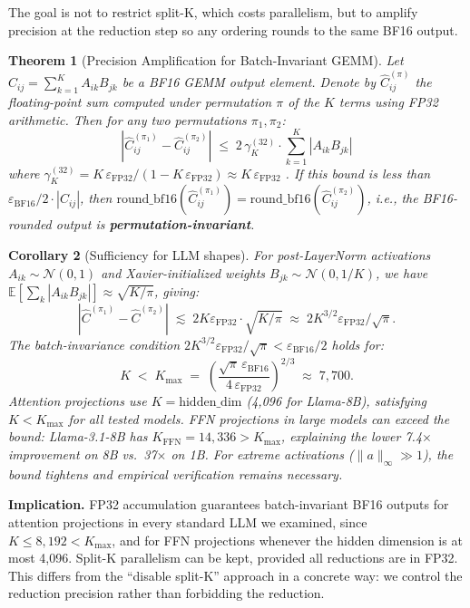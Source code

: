 \documentclass{article}
\newtheorem{theorem}{Theorem}
\newtheorem{corollary}[theorem]{Corollary}
\begin{document}
The goal is not to restrict split-K, which costs parallelism, but to amplify
precision at the reduction step so any ordering rounds to the same BF16 output.

\begin{theorem}[Precision Amplification for Batch-Invariant GEMM]
\label{thm:pa}
Let $C_{ij} = \sum_{k=1}^{K} A_{ik} B_{jk}$ be a BF16 GEMM output element.  Denote by
$\hat{C}_{ij}^{(\pi)}$ the floating-point sum computed under permutation $\pi$ of the
$K$ terms using FP32 arithmetic.  Then for any two permutations $\pi_1, \pi_2$:
\[
  |\hat{C}_{ij}^{(\pi_1)} - \hat{C}_{ij}^{(\pi_2)}|
  \;\le\; 2\,\gamma_K^{(32)} \cdot \sum_{k=1}^{K} |A_{ik} B_{jk}|
\]
where $\gamma_K^{(32)} = K\,\varepsilon_{\mathrm{FP32}}/(1 - K\,\varepsilon_{\mathrm{FP32}})
\approx K\,\varepsilon_{\mathrm{FP32}}$ \citep{higham2002accuracy}.  If this bound is
less than $\varepsilon_{\mathrm{BF16}}/2 \cdot |C_{ij}|$, then
$\mathrm{round\_bf16}(\hat{C}_{ij}^{(\pi_1)}) = \mathrm{round\_bf16}(\hat{C}_{ij}^{(\pi_2)})$,
i.e., the BF16-rounded output is \textbf{permutation-invariant}.
\end{theorem}

\begin{corollary}[Sufficiency for LLM shapes]
\label{cor:llm}
For post-LayerNorm activations $A_{ik} \sim \mathcal{N}(0,1)$ and Xavier-initialized
weights $B_{jk} \sim \mathcal{N}(0, 1/K)$, we have
$\mathbb{E}[\sum_k |A_{ik} B_{jk}|] \approx \sqrt{K/\pi}$, giving:
\[
  |\hat{C}^{(\pi_1)} - \hat{C}^{(\pi_2)}|
  \;\lesssim\; 2 K \varepsilon_{\mathrm{FP32}} \cdot \sqrt{K/\pi}
  \;\approx\; 2K^{3/2} \varepsilon_{\mathrm{FP32}} / \sqrt{\pi}.
\]
The batch-invariance condition $2K^{3/2}\varepsilon_{\mathrm{FP32}}/\sqrt{\pi} <
\varepsilon_{\mathrm{BF16}}/2$ holds for:
\[
  K \;<\; K_{\max} \;=\; \left(\frac{\sqrt{\pi}\,\varepsilon_{\mathrm{BF16}}}{4\,\varepsilon_{\mathrm{FP32}}}\right)^{2/3}
  \;\approx\; 7{,}700.
\]
Attention projections use $K\!=\!\text{hidden\_dim}$ (4{,}096 for Llama-8B), satisfying
$K < K_{\max}$ for all tested models.  FFN projections in large models can exceed the
bound: Llama-3.1-8B has $K_{\mathrm{FFN}}\!=\!14{,}336 > K_{\max}$, explaining the
lower 7.4$\times$ improvement on 8B vs.\ 37$\times$ on 1B.  For extreme activations
($\|a\|_\infty \gg 1$), the bound tightens and empirical verification remains necessary.
\end{corollary}

\textbf{Implication.}
FP32 accumulation guarantees batch-invariant BF16 outputs for attention projections
in every standard LLM we examined, since $K\!\le\!8{,}192<K_{\max}$, and for FFN
projections whenever the hidden dimension is at most 4{,}096. Split-K parallelism
can be kept, provided all reductions are in FP32. This differs from the
``disable split-K'' approach in a concrete way: we control the reduction precision
rather than forbidding the reduction.
\end{document}
